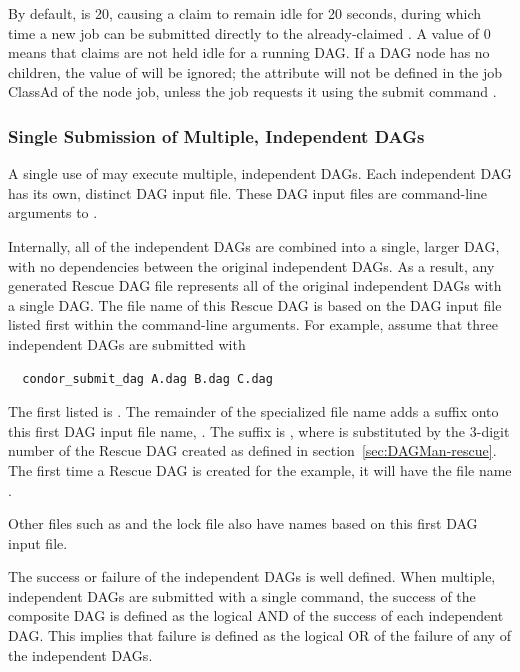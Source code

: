 By default,  is 20, 
causing a claim to remain idle for 20 seconds, 
during which time a new job can be submitted
directly to the already-claimed . 
A value of 0 means that claims are not held idle for a running DAG.
If a DAG node has no children,
the value of  will be ignored;
the  attribute will not be defined in the job ClassAd 
of the node job, unless the job requests it using the submit command
. 

\subsubsection{\label{sec:MultipleDAGs}Single Submission of Multiple, Independent DAGs}

A single use of  may execute multiple, independent DAGs.
Each independent DAG has its own, distinct DAG input file.
These DAG input files are command-line arguments to
.

Internally, all of the independent DAGs are combined
into a single, larger DAG, with no dependencies between
the original independent DAGs.
As a result,
any generated Rescue DAG file represents all of the original independent DAGs
with a single DAG.
The file name of this Rescue DAG is based on the DAG input file
listed first within the command-line arguments.
For example, assume that three independent DAGs are submitted with
\begin{verbatim}
  condor_submit_dag A.dag B.dag C.dag
\end{verbatim}
The first listed is .
The remainder of the specialized file name adds a suffix
onto this first DAG input file name, .
The suffix is ,
where  is substituted by the 3-digit number of the
Rescue DAG created as defined in section~\ref{sec:DAGMan-rescue}.
The first time a Rescue DAG is created for the example,
it will have the file name .

Other files such
as  and the lock file also have names based on this
first DAG input file.

The success or failure of the independent DAGs is well defined.
When multiple, independent DAGs are submitted with a single
command, the
success of the composite DAG is defined as the logical AND
of the success of each independent DAG.
This implies that failure is defined as the logical OR
of the failure of any of the independent DAGs.

